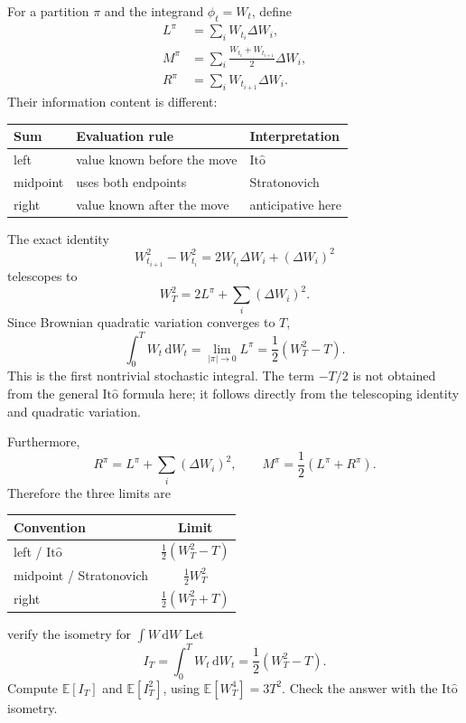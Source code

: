\documentclass[10pt]{article}
\newcommand{\E}{\mathbb E}
\newcommand{\1}{\mathbf 1}
\newcommand{\dd}{\,\mathrm d}
\newcommand{\Ito}{\mathrm{It\hat{o}}}
\theoremstyle{definition}
\begin{document}
For a partition \(\pi\) and the integrand \(\phi_t=W_t\), define
\begin{align*}
L^\pi&=\sum_iW_{t_i}\Delta W_i,\\
M^\pi&=\sum_i\frac{W_{t_i}+W_{t_{i+1}}}{2}\Delta W_i,\\
R^\pi&=\sum_iW_{t_{i+1}}\Delta W_i.
\end{align*}
Their information content is different:
\begin{center}
\begin{tabular}{lll}
\toprule
Sum & Evaluation rule & Interpretation \\
\midrule
left & value known before the move & \(\Ito\) \\
midpoint & uses both endpoints & Stratonovich \\
right & value known after the move & anticipative here \\
\bottomrule
\end{tabular}
\end{center}

The exact identity
\[
W_{t_{i+1}}^2-W_{t_i}^2
=2W_{t_i}\Delta W_i+(\Delta W_i)^2
\]
telescopes to
\[
W_T^2=2L^\pi+\sum_i(\Delta W_i)^2.
\]
Since Brownian quadratic variation converges to \(T\),
\[
\boxed{
\int_0^TW_t\dd W_t
=\lim_{|\pi|\to0}L^\pi
=\frac12(W_T^2-T).}
\]
This is the first nontrivial stochastic integral. The term \(-T/2\) is not
obtained from the general \(\Ito\) formula here; it follows directly from the
telescoping identity and quadratic variation.

Furthermore,
\[
R^\pi=L^\pi+\sum_i(\Delta W_i)^2,
\qquad
M^\pi=\frac12(L^\pi+R^\pi).
\]
Therefore the three limits are
\begin{center}
\begin{tabular}{lc}
\toprule
Convention & Limit \\
\midrule
left / \(\Ito\) & \(\frac12(W_T^2-T)\) \\
midpoint / Stratonovich & \(\frac12W_T^2\) \\
right & \(\frac12(W_T^2+T)\) \\
\bottomrule
\end{tabular}
\end{center}

\begin{studentexercise}{verify the isometry for \(\int W\dd W\)}
Let
\[
I_T=\int_0^TW_t\dd W_t=\frac12(W_T^2-T).
\]
Compute \(\E[I_T]\) and \(\E[I_T^2]\), using
\(\E[W_T^4]=3T^2\). Check the answer with the \(\Ito\) isometry.
\end{studentexercise}
\end{document}
